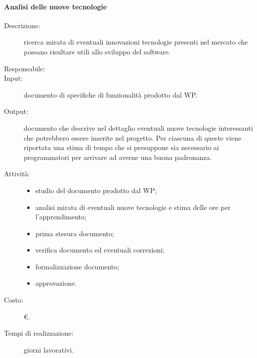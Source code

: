\paragraph{Analisi delle nuove tecnologie}
\begin{description}
\item[Descrizione:] ricerca mirata di eventuali innovazioni tecnologie presenti nel mercato che possano risultare utili allo sviluppo del software.
\item[Responsabile:]
\item[Input:] documento di specifiche di funzionalità prodotto dal WP.
\item[Output:] documento che descrive nel dettaglio eventuali nuove tecnologie interessanti che potrebbero essere inserite nel progetto. Per ciascuna di queste viene riportata una stima di tempo che si presuppone sia necessario ai programmatori per arrivare ad averne una buona padronanza.
\item[Attività:]
\begin{itemize}
\item studio del documento prodotto dal WP;
\item analisi mirata di eventuali nuove tecnologie e stima delle ore per l'apprendimento;
\item prima stesura documento;
\item verifica documento ed eventuali correzioni;
\item formalizzazione documento;
\item approvazione.
\end{itemize}
\item[Costo:] \euro{}.
\item[Tempi di realizzazione:]  giorni lavorativi.
\end{description}


